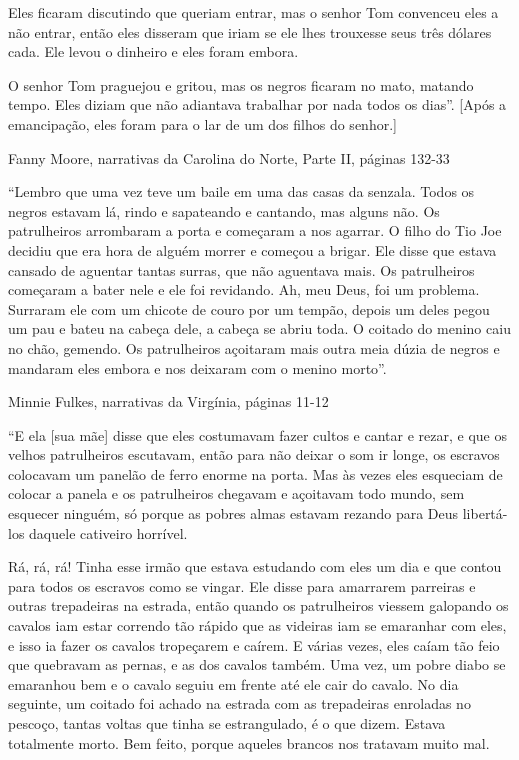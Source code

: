 Eles ficaram discutindo que queriam entrar, mas o senhor Tom convenceu
eles a não entrar, então eles disseram que iriam se ele lhes trouxesse
seus três dólares cada. Ele levou o dinheiro e eles foram embora.

O senhor Tom praguejou e gritou, mas os negros ficaram no mato, matando
tempo. Eles diziam que não adiantava trabalhar por nada todos os dias''.
{[}Após a emancipação, eles foram para o lar de um dos filhos do
senhor.{]}

Fanny Moore, narrativas da Carolina do Norte, Parte II, páginas 132-33

``Lembro que uma vez teve um baile em uma das casas da senzala. Todos os
negros estavam lá, rindo e sapateando e cantando, mas alguns não. Os
patrulheiros arrombaram a porta e começaram a nos agarrar. O filho do
Tio Joe decidiu que era hora de alguém morrer e começou a brigar. Ele
disse que estava cansado de aguentar tantas surras, que não aguentava
mais. Os patrulheiros começaram a bater nele e ele foi revidando. Ah,
meu Deus, foi um problema. Surraram ele com um chicote de couro por um
tempão, depois um deles pegou um pau e bateu na cabeça dele, a cabeça se
abriu toda. O coitado do menino caiu no chão, gemendo. Os patrulheiros
açoitaram mais outra meia dúzia de negros e mandaram eles embora e nos
deixaram com o menino morto''.

Minnie Fulkes, narrativas da Virgínia, páginas 11-12

``E ela {[}sua mãe{]} disse que eles costumavam fazer cultos e cantar e
rezar, e que os velhos patrulheiros escutavam, então para não deixar o
som ir longe, os escravos colocavam um panelão de ferro enorme na porta.
Mas às vezes eles esqueciam de colocar a panela e os patrulheiros
chegavam e açoitavam todo mundo, sem esquecer ninguém, só porque as
pobres almas estavam rezando para Deus libertá-los daquele cativeiro
horrível.

Rá, rá, rá! Tinha esse irmão que estava estudando com eles um dia e que
contou para todos os escravos como se vingar. Ele disse para amarrarem
parreiras e outras trepadeiras na estrada, então quando os patrulheiros
viessem galopando os cavalos iam estar correndo tão rápido que as
videiras iam se emaranhar com eles, e isso ia fazer os cavalos
tropeçarem e caírem. E várias vezes, eles caíam tão feio que quebravam
as pernas, e as dos cavalos também. Uma vez, um pobre diabo se emaranhou
bem e o cavalo seguiu em frente até ele cair do cavalo. No dia seguinte,
um coitado foi achado na estrada com as trepadeiras enroladas no
pescoço, tantas voltas que tinha se estrangulado, é o que dizem. Estava
totalmente morto. Bem feito, porque aqueles brancos nos tratavam muito
mal.

